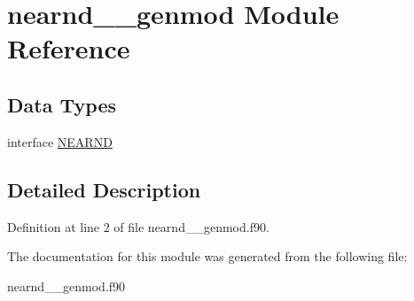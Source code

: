 \hypertarget{classnearnd____genmod}{\section{nearnd\+\_\+\+\_\+genmod Module Reference}
\label{classnearnd____genmod}
}
\subsection*{Data Types}
\begin{DoxyCompactItemize}
\item 
interface \hyperlink{interfacenearnd____genmod_1_1_n_e_a_r_n_d}{N\+E\+A\+R\+N\+D}
\end{DoxyCompactItemize}


\subsection{Detailed Description}


Definition at line 2 of file nearnd\+\_\+\+\_\+genmod.\+f90.



The documentation for this module was generated from the following file\+:\begin{DoxyCompactItemize}
\item 
nearnd\+\_\+\+\_\+genmod.\+f90\end{DoxyCompactItemize}
